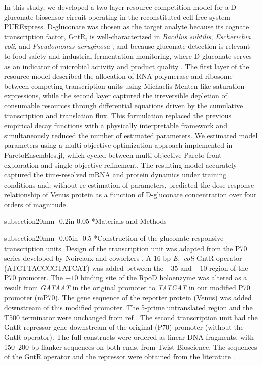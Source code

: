 \documentclass[12pt]{article}
\makeatletter
\renewcommand\subsection{\@startsection
	{subsection}{2}{0mm}
	{-0.05in}
	{-0.5\baselineskip}
	{\normalfont\normalsize\bfseries}}
\renewcommand\section{\@startsection
	{subsection}{2}{0mm}
	{-0.2in}
	{0.05\baselineskip}
	{\normalfont\large\bfseries}}
\makeatother
\begin{document}
In this study, we developed a two-layer resource competition model for a D-gluconate biosensor circuit operating in the reconstituted cell-free system PURExpress. D-gluconate was chosen as the target analyte because its cognate transcription factor, GntR, is well-characterized in \textit{Bacillus subtilis}, \textit{Escherichia coli}, and \textit{Pseudomonas aeruginosa} \cite{Miwa1988,Fujita1989,Peekhaus1998,Yoshida1995,daddaoua2017identification}, and because gluconate detection is relevant to food safety and industrial fermentation monitoring, where D-gluconate serves as an indicator of microbial activity and product quality \cite{ramachandran2006gluconic}. The first layer of the resource model described the allocation of RNA polymerase and ribosome between competing transcription units using Michaelis-Menten-like saturation expressions, while the second layer captured the irreversible depletion of consumable resources through differential equations driven by the cumulative transcription and translation flux. This formulation replaced the previous empirical decay functions with a physically interpretable framework and simultaneously reduced the number of estimated parameters. We estimated model parameters using a multi-objective optimization approach implemented in ParetoEnsembles.jl, which cycled between multi-objective Pareto front exploration and single-objective refinement. The resulting model accurately captured the time-resolved mRNA and protein dynamics under training conditions and, without re-estimation of parameters, predicted the dose-response relationship of Venus protein as a function of D-gluconate concentration over four orders of magnitude.

\clearpage
\section*{Materials and Methods}

\subsection*{Construction of the gluconate-responsive transcription units.}
Design of the transcription unit was adapted from the P70 series developed by Noireaux and coworkers \cite{shin2010efficient}. A 16 bp \textit{E.~coli} GntR operator (ATGTTACCCGTATCAT) was added between the $-35$ and $-10$ region of the P70 promoter. The $-10$ binding site of the RpoD holoenzyme was altered as a result from \textit{GATAAT} in the original promoter to \textit{TATCAT} in our modified P70 promoter (mP70). The gene sequence of the reporter protein (Venus) was added downstream of this modified promoter. The 5-prime untranslated region and the T500 terminator were unchanged from ref \cite{shin2010efficient}. The second transcription unit had the GntR repressor gene downstream of the original (P70) promoter (without the GntR operator). The full constructs were ordered as linear DNA fragments, with 150--200 bp flanker sequences on both ends, from Twist Bioscience. The sequences of the GntR operator and the repressor were obtained from the literature \cite{Peekhaus1998,izu1997gene}.
\end{document}
